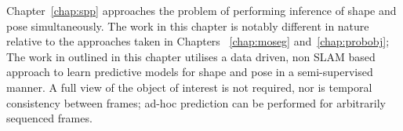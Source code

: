 Chapter~\ref{chap:spp} approaches the problem of performing inference of shape and pose simultaneously. 
The work in this chapter is notably different in nature relative to the approaches taken in Chapters
~\ref{chap:moseg} and~\ref{chap:probobj}; The work in outlined in this chapter utilises a data driven, 
non SLAM based approach to learn predictive models for shape and pose in a semi-supervised manner. A full 
view of the object of interest is not required, nor is temporal consistency between frames; ad-hoc prediction 
can be performed for arbitrarily sequenced frames.